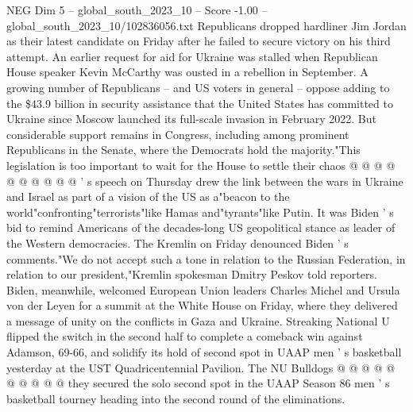 \begin{textsample}{NEG Dim 5 – global\_south\_2023\_10 – Score -1.00 – global\_south\_2023\_10/102836056.txt}
Republicans dropped hardliner Jim Jordan as their latest candidate on Friday after he failed to secure victory on his third attempt.
An earlier request for aid for Ukraine was stalled when Republican House speaker Kevin McCarthy was ousted in a rebellion in September.
A growing number of Republicans -- and US voters in general -- oppose adding to the \$43.9 billion in security assistance that the United States has committed to Ukraine since Moscow launched its full-scale invasion in February 2022.
But considerable support remains in Congress, including among prominent Republicans in the Senate, where the Democrats hold the majority."This legislation is too important to wait for the House to settle their chaos @ @ @ @ @ @ @ @ @ @ ' s speech on Thursday drew the link between the wars in Ukraine and Israel as part of a vision of the US as a"beacon to the world"confronting"terrorists"like Hamas and"tyrants"like Putin.
It was Biden ' s bid to remind Americans of the decades-long US geopolitical stance as leader of the Western democracies.
The Kremlin on Friday denounced Biden ' s comments."We do not accept such a tone in relation to the Russian Federation, in relation to our president,"Kremlin spokesman Dmitry Peskov told reporters.
Biden, meanwhile, welcomed European Union leaders Charles Michel and Ursula von der Leyen for a summit at the White House on Friday, where they delivered a message of unity on the conflicts in Gaza and Ukraine.
Streaking National U flipped the switch in the second half to complete a comeback win against Adamson, 69-66, and solidify its hold of second spot in UAAP men ' s basketball yesterday at the UST Quadricentennial Pavilion.
The NU Bulldogs @ @ @ @ @ @ @ @ @ @ they secured the solo second spot in the UAAP Season 86 men ' s basketball tourney heading into the second round of the eliminations.

\end{textsample}
